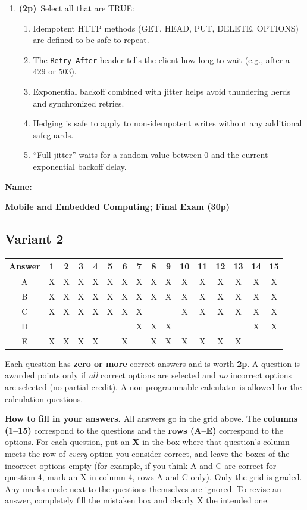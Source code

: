 \documentclass[11pt]{article}
\newcommand{\pts}{\textbf{(2p)}~}
\newcommand{\nameheader}{%
  \noindent\textbf{Name:}~\underline{\hspace{8cm}}\par\vspace{4pt}
}
\newcommand{\examtitle}{%
  \begin{center}
  {\large\bfseries Mobile and Embedded Computing; Final Exam (30p)}
  \end{center}
  \vspace{-4pt}
}
\newcommand{\answergridtwo}{%
  \begin{center}
  \renewcommand{\arraystretch}{1.6}
  \begin{tabular}{|c|*{15}{c|}}
  \hline
  Answer & 1 & 2 & 3 & 4 & 5 & 6 & 7 & 8 & 9 & 10 & 11 & 12 & 13 & 14 & 15 \\
  \hline
  A & X & X & X & X & X & X & X & X & X & X & X & X & X & X & X \\
  \hline
  B & X & X & X & X & X & X & X & X & X & X & X & X & X & X & X \\
  \hline
  C & X & X & X & X & X & X & X &   &   & X & X & X & X & X & X \\
  \hline
  D &   &   &   &   &   &   & X & X & X &   &   &   &   & X & X \\
  \hline
  E & X & X & X & X &   & X &   & X & X & X & X & X & X &   &   \\
  \hline
  \end{tabular}
  \end{center}
}
\newcommand{\instructions}{%
  \small
  \noindent Each question has \textbf{zero or more} correct answers and is worth \textbf{2p}. A question is awarded points only if \emph{all} correct options are selected and \emph{no} incorrect options are selected (no partial credit). A non-programmable calculator is allowed for the calculation questions.

  \smallskip
  \noindent\textbf{How to fill in your answers.} All answers go in the grid above. The \textbf{columns (1--15)} correspond to the questions and the \textbf{rows (A--E)} correspond to the options. For each question, put an \textbf{X} in the box where that question's column meets the row of \emph{every} option you consider correct, and leave the boxes of the incorrect options empty (for example, if you think A and C are correct for question 4, mark an X in column 4, rows A and C only). Only the grid is graded. Any marks made next to the questions themselves are ignored. To revise an answer, completely fill the mistaken box and clearly X the intended one.
  \normalsize\par\smallskip
}
\begin{document}
\begin{enumerate}
    \item \pts Select all that are TRUE:
    \begin{enumerate}
      \item Idempotent HTTP methods (GET, HEAD, PUT, DELETE, OPTIONS) are defined to be safe to repeat.
      \item The \texttt{Retry-After} header tells the client how long to wait (e.g., after a 429 or 503).
      \item Exponential backoff combined with jitter helps avoid thundering herds and synchronized retries.
      \item Hedging is safe to apply to non-idempotent writes without any additional safeguards.
      \item ``Full jitter'' waits for a random value between 0 and the current exponential backoff delay.
    \end{enumerate}

  \end{enumerate}

  \newpage

  \nameheader
  \examtitle

  \subsection*{Variant 2}

  \answergridtwo

  \instructions
\end{document}

